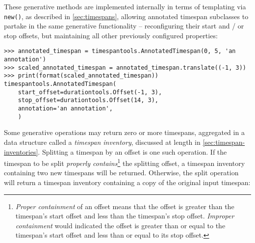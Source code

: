 \noindent These generative methods are implemented internally in terms of
templating via \texttt{new()}, as described in \autoref{sec:timespans},
allowing annotated timespan subclasses to partake in the same generative
functionality -- reconfiguring their start and / or stop offsets, but
maintaining all other previously configured properties:

\begin{comment}
<abjad>
annotated_timespan = timespantools.AnnotatedTimespan(0, 5, 'an annotation')
scaled_annotated_timespan = annotated_timespan.translate((-1, 3))
print(format(scaled_annotated_timespan))
</abjad>
\end{comment}

\begin{singlespacing}
\vspace{-0.5\baselineskip}
\begin{lstlisting}
>>> annotated_timespan = timespantools.AnnotatedTimespan(0, 5, 'an annotation')
>>> scaled_annotated_timespan = annotated_timespan.translate((-1, 3))
>>> print(format(scaled_annotated_timespan))
timespantools.AnnotatedTimespan(
    start_offset=durationtools.Offset(-1, 3),
    stop_offset=durationtools.Offset(14, 3),
    annotation='an annotation',
    )
\end{lstlisting}
\end{singlespacing}

\noindent Some generative operations may return zero or more timespans,
aggregated in a data structure called a \emph{timespan inventory}, discussed at
length in \autoref{sec:timespan-inventories}. Splitting a timespan by an offset
is one such operation. If the timespan to be split \emph{properly
contains}\footnote{\emph{Proper containment} of an offset means that the offset
is greater than the timespan's start offset and less than the timespan's stop
offset. \emph{Improper containment} would indicated the offset is greater than
or equal to the timespan's start offset and less than or equal to its stop
offset.} the splitting offset, a timespan inventory containing two new
timespans will be returned. Otherwise, the split operation will return a
timespan inventory containing a copy of the original input timespan:

\begin{comment}
<abjad>
two_shards = timespan.split_at_offset(5)
print(format(two_shards))
one_shard = timespan.split_at_offset(10000)
print(format(one_shard))
</abjad>
\end{comment}

